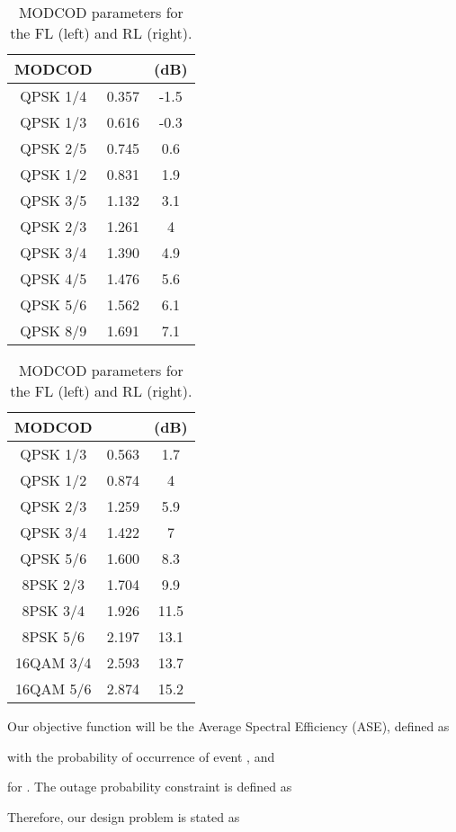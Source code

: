 \documentclass[journal,onecolumn,10pt,a4paper]{IEEEtran}
\begin{document}
\begin{table}
  \caption{MODCOD parameters for the FL (left) and RL (right).}
  \label{tbl:modcod}


  \centering
  \begin{tabular}{|c | c | c |} \hline
MODCOD &  &  (dB) \\ \hline \hline
QPSK 1/4 & 0.357 & -1.5 \\ \hline
QPSK 1/3 & 0.616 & -0.3 \\ \hline
QPSK 2/5 & 0.745 & 0.6 \\ \hline
QPSK 1/2 & 0.831 & 1.9 \\ \hline
QPSK 3/5 & 1.132 & 3.1 \\ \hline
QPSK 2/3 & 1.261 & 4 \\ \hline
QPSK 3/4 & 1.390 & 4.9 \\ \hline
QPSK 4/5 & 1.476 & 5.6 \\ \hline
QPSK 5/6 & 1.562 & 6.1 \\ \hline
QPSK 8/9 & 1.691 & 7.1 \\ \hline
  \end{tabular}\hspace*{1cm} 
  \begin{tabular}{|c | c | c |} \hline
MODCOD &  &  (dB) \\ \hline \hline
QPSK 1/3 & 0.563 & 1.7\\ \hline
QPSK 1/2 & 0.874 & 4\\ \hline
QPSK 2/3 & 1.259 & 5.9\\ \hline
QPSK 3/4 & 1.422 & 7 \\ \hline
QPSK 5/6 & 1.600 & 8.3 \\ \hline
8PSK 2/3 & 1.704 & 9.9\\ \hline
8PSK 3/4 & 1.926 & 11.5\\ \hline
8PSK 5/6 & 2.197 & 13.1\\ \hline
16QAM 3/4 & 2.593 & 13.7 \\ \hline
16QAM 5/6 & 2.874 & 15.2\\ \hline
  \end{tabular}
\end{table}
 

Our objective function will be the Average Spectral Efficiency (ASE), defined as

with  the probability of occurrence of event , and

for . The outage probability constraint is defined as

Therefore, our design problem is stated as
\end{document}
